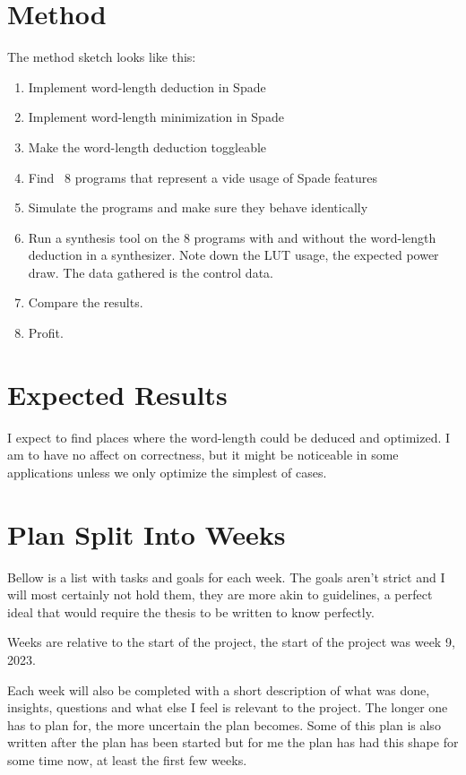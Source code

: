 \documentclass[msc,lith,english]{liuthesis}
\begin{document}
\section{Method}
The method sketch looks like this:
\begin{enumerate}
  \item Implement word-length deduction in Spade
  \item Implement word-length minimization in Spade
  \item Make the word-length deduction toggleable
  \item Find ~8 programs that represent a vide usage of Spade features
  \item Simulate the programs and make sure they behave identically
  \item Run a synthesis tool on the 8 programs with and without the word-length deduction in a synthesizer. Note down the LUT usage, the expected power draw. The data gathered is the control data.
  \item Compare the results.
  \item Profit.
\end{enumerate}

\section{Expected Results}
I expect to find places where the word-length could be deduced and optimized. I am to have no affect on correctness, but it might be noticeable in some applications unless we only optimize the simplest of cases.

\newpage
\section{Plan Split Into Weeks}
Bellow is a list with tasks and goals for each week. The goals aren't strict and I will most certainly not hold them, they are more akin to guidelines, a perfect ideal that would require the thesis to be written to know perfectly. 

Weeks are relative to the start of the project, the start of the project was week 9, 2023.

Each week will also be completed with a short description of what was done, insights, questions and what else I feel is relevant to the project. The longer one has to plan for, the more uncertain the plan becomes. Some of this plan is also written after the plan has been started but for me the plan has had this shape for some time now, at least the first few weeks.
\end{document}
